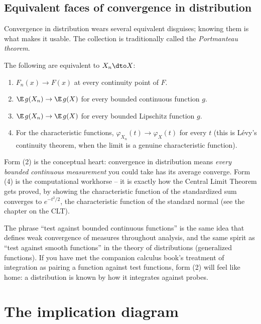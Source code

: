 \subsection{Equivalent faces of convergence in distribution}
\label{ch22:portmanteau}

Convergence in distribution wears several equivalent disguises; knowing them is what
makes it usable. The collection is traditionally called the \emph{Portmanteau theorem}.

\begin{theorem}
\label{ch22:thm-portmanteau}
The following are equivalent to $X_n \dto X$:
\begin{enumerate}
\item $F_n(x)\to F(x)$ at every continuity point of $F$.
\item $\E\, g(X_n) \to \E\, g(X)$ for every bounded continuous function $g$.
\item $\E\, g(X_n) \to \E\, g(X)$ for every bounded Lipschitz function $g$.
\item For the characteristic functions, $\varphi_{X_n}(t)\to\varphi_X(t)$ for every
      $t$ (this is L\'evy's continuity theorem, when the limit is a genuine
      characteristic function).
\end{enumerate}
\end{theorem}

Form (2) is the conceptual heart: convergence in distribution means \emph{every
bounded continuous measurement} you could take has its average converge. Form (4) is
the computational workhorse -- it is exactly how the Central Limit Theorem gets proved,
by showing the characteristic function of the standardized sum converges to
$e^{-t^2/2}$, the characteristic function of the standard normal (see the chapter on
the CLT).

\begin{connectionbox}
The phrase ``test against bounded continuous functions'' is the same idea that defines
weak convergence of measures throughout analysis, and the same spirit as ``test
against smooth functions'' in the theory of distributions (generalized functions). If
you have met the companion calculus book's treatment of integration as pairing a
function against test functions, form (2) will feel like home: a distribution is
known by how it integrates against probes.
\end{connectionbox}

\section{The implication diagram}
\label{ch22:diagram}

